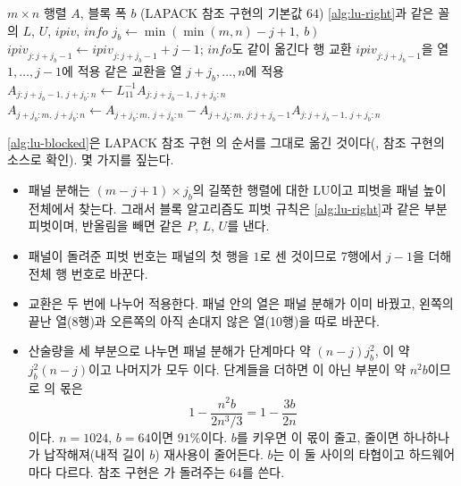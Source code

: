 \begin{algorithm}[t]
\begin{algorithmic}[1]
\Require $m\times n$ 행렬 $A$, 블록 폭 $b$ (LAPACK 참조 구현의 기본값 $64$)
\Ensure \cref{alg:lu-right}과 같은 꼴의 $L$, $U$, $\mathit{ipiv}$, $\mathit{info}$
  \State \Return {} 
\EndIf
{}
  \State $j_b\gets\min(\min(m,n)-j+1,\ b)$
  \State {} 
  \State $\mathit{ipiv}_{j:j+j_b-1}\gets\mathit{ipiv}_{j:j+j_b-1}+j-1$; $\mathit{info}$도 같이 옮긴다
  \State 행 교환 $\mathit{ipiv}_{j:j+j_b-1}$을 열 $1,\dots,j-1$에 적용 
    \State 같은 교환을 열 $j+j_b,\dots,n$에 적용 
    \State $A_{j:j+j_b-1,\,j+j_b:n}\gets L_{11}^{-1}A_{j:j+j_b-1,\,j+j_b:n}$ 
      \State $A_{j+j_b:m,\,j+j_b:n}\gets A_{j+j_b:m,\,j+j_b:n}-A_{j+j_b:m,\,j:j+j_b-1}A_{j:j+j_b-1,\,j+j_b:n}$ 
    \EndIf
  \EndIf
\EndFor
\end{algorithmic}
\caption{블록 오른쪽 보기 LU (LAPACK 의 구조를 그대로 옮김)}
\label{alg:lu-blocked}
\end{algorithm}

\cref{alg:lu-blocked}은 LAPACK 참조 구현 의 순서를 그대로 옮긴 것이다(\cite{anderson1999lapack}, 참조 구현의 소스로 확인). 몇 가지를 짚는다.
\begin{itemize}
\item 패널 분해는 $(m-j+1)\times j_b$의 길쭉한 행렬에 대한 LU이고 피벗을 패널 높이 전체에서 찾는다. 그래서 블록 알고리즘도 피벗 규칙은 \cref{alg:lu-right}과 같은 부분 피벗이며, 반올림을 빼면 같은 $P$, $L$, $U$를 낸다.
\item 패널이 돌려준 피벗 번호는 패널의 첫 행을 $1$로 센 것이므로 7행에서 $j-1$을 더해 전체 행 번호로 바꾼다.
\item 교환은 두 번에 나누어 적용한다. 패널 안의 열은 패널 분해가 이미 바꿨고, 왼쪽의 끝난 열(8행)과 오른쪽의 아직 손대지 않은 열(10행)을 따로 바꾼다.
\item 산술량을 세 부분으로 나누면 패널 분해가 단계마다 약 $(n-j)j_b^2$, 이 약 $j_b^2(n-j)$이고 나머지가 모두 이다. 단계들을 더하면 이 아닌 부분이 약 $n^2b$이므로 의 몫은
\[
1-\frac{n^2b}{2n^3/3}=1-\frac{3b}{2n}
\]
이다. $n=1024$, $b=64$이면 $91\%$이다. $b$를 키우면 이 몫이 줄고, 줄이면  하나하나가 납작해져(내적 길이 $b$) 재사용이 줄어든다. $b$는 이 둘 사이의 타협이고 하드웨어마다 다르다. 참조 구현은 가 돌려주는 $64$를 쓴다.
\end{itemize}

